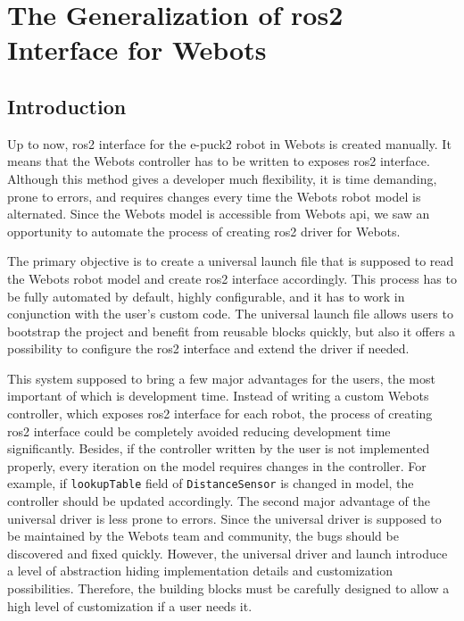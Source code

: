 \chapter{The Generalization of \ac{ros2} Interface for Webots}
\label{chap:generalization}


\section{Introduction}
\label{sec:generalization:introduction}

Up to now, \ac{ros2} interface for the e-puck2 robot in Webots is created manually.
It means that the Webots controller has to be written to exposes \ac{ros2} interface.
Although this method gives a developer much flexibility, it is time demanding, prone to errors, and requires changes every time the Webots robot model is alternated.
Since the Webots model is accessible from Webots \ac{api}, we saw an opportunity to automate the process of creating \ac{ros2} driver for Webots.

The primary objective is to create a universal launch file that is supposed to read the Webots robot model and create \ac{ros2} interface accordingly.
This process has to be fully automated by default, highly configurable, and it has to work in conjunction with the user's custom code.
The universal launch file allows users to bootstrap the project and benefit from reusable blocks quickly, but also it offers a possibility to configure the \ac{ros2} interface and extend the driver if needed.

This system supposed to bring a few major advantages for the users, the most important of which is development time.
Instead of writing a custom Webots controller, which exposes \ac{ros2} interface for each robot, the process of creating \ac{ros2} interface could be completely avoided reducing development time significantly.
Besides, if the controller written by the user is not implemented properly, every iteration on the model requires changes in the controller.
For example, if \texttt{lookupTable} field of \texttt{DistanceSensor} is changed in model, the controller should be updated accordingly.
The second major advantage of the universal driver is less prone to errors.
Since the universal driver is supposed to be maintained by the Webots team and community, the bugs should be discovered and fixed quickly.
However, the universal driver and launch introduce a level of abstraction hiding implementation details and customization possibilities.
Therefore, the building blocks must be carefully designed to allow a high level of customization if a user needs it.

